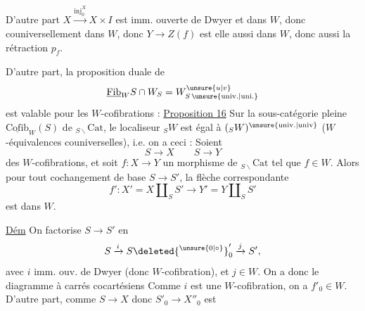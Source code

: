  D'autre part $X\xrightarrow{\mathrm{inj}_0^X}X\times I$ est imm. ouverte de Dwyer et dans $W$, donc couniversellement dans $W$, donc $Y\longrightarrow Z(f)$ est elle aussi dans $W$, donc aussi la rétraction $p_f$.

D'autre part, la proposition duale de
\[
\underline{\mathrm{Fib}}_W S\cap W_S=W^{\unsure{u|v}}_{S\,\unsure{\mathrm{univ.}|\mathrm{uni.}}}
\]
est valable pour les $W$-cofibrations :
\uline{Proposition 16} Sur  la sous-catégorie pleine $\underline{\mathrm{Cofib}}_W(S)$ de $ {}_{S\backslash}\mathrm{Cat}$, le localiseur $ {}_S W$ est égal à $({}_S W)^{\unsure{\mathrm{univ.}|\mathrm{univ}}}$ ($W$-équivalences couniverselles), i.e. on a ceci : Soient
\[
S\longrightarrow X\qquad S\longrightarrow Y
\]
des $W$-cofibrations, et soit $f:X\longrightarrow Y$ un morphisme de $ {}_{S\backslash}\mathrm{Cat}$ tel que $f\in W$. Alors pour tout cochangement de base $S\longrightarrow S'$, la flèche correspondante
\[
f':X'=X\amalg_S S'\longrightarrow Y'=Y\amalg_S S'
\]
est dans $W$.

\uline{Dém} On factorise  $S\longrightarrow S'$ en
\[
S\xrightarrow{i}S\deleted{^{\unsure{0|\circ}}}'_0\xrightarrow{j}S',
\]
avec $i$ imm. ouv. de Dwyer (donc $W$-cofibration), et $j\in W$. On a donc le diagramme à carrés cocartésiens
Comme $i$ est une $W$-cofibration,  on a $f'_0\in W$. D’autre part, comme $S\longrightarrow X$ donc $S'_0\longrightarrow X''_0$ est
